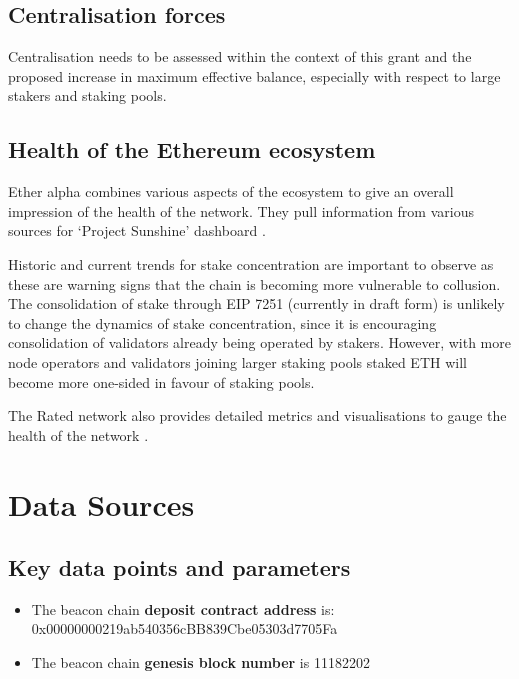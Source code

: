 \documentclass[UTF8]{article}
\begin{document}
\subsection{Centralisation forces}
Centralisation needs to be assessed within the context of this grant and the proposed increase in maximum effective balance, especially with respect to large stakers and staking pools.


\subsection{Health of the Ethereum ecosystem}
Ether alpha combines various aspects of the ecosystem to give an overall impression of the health of the network. They pull information from various sources for `Project Sunshine' dashboard \cite{easunshine}. 

Historic and current trends for stake concentration are important to observe as these are warning signs that the chain is becoming more vulnerable to collusion. The consolidation of stake through EIP 7251 (currently in draft form) \cite{Neuder2023c} is unlikely to change the dynamics of stake concentration, since it is encouraging consolidation of validators already being operated by stakers. However, with more node operators and validators joining larger staking pools staked ETH will become more one-sided in favour of staking pools. 

The Rated network also provides detailed metrics and visualisations to gauge the health of the network \cite{Rated2023a}. 

\section{Data Sources}
\label{sec:sources}
\subsection{Key data points and parameters}
\begin{itemize}
\item The beacon chain \textbf{deposit contract address} is: 0x00000000219ab540356cBB839Cbe05303d7705Fa 
\item The beacon chain \textbf{genesis block number} is 11182202
\end{itemize}
\end{document}
